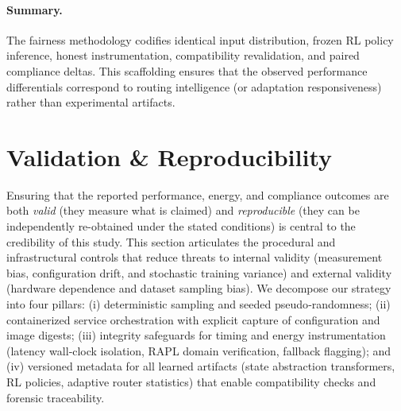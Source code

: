 \paragraph{Summary.}
The fairness methodology codifies identical input distribution, frozen RL policy inference, honest instrumentation, compatibility revalidation, and paired compliance deltas. This scaffolding ensures that the observed performance differentials correspond to routing intelligence (or adaptation responsiveness) rather than experimental artifacts.
 
\section{Validation \& Reproducibility}\label{s:validation-reproducibility}
Ensuring that the reported performance, energy, and compliance outcomes are both \emph{valid} (they measure what is claimed) and \emph{reproducible} (they can be independently re-obtained under the stated conditions) is central to the credibility of this study. This section articulates the procedural and infrastructural controls that reduce threats to internal validity (measurement bias, configuration drift, and stochastic training variance) and external validity (hardware dependence and dataset sampling bias). We decompose our strategy into four pillars: (i) deterministic sampling and seeded pseudo‑randomness; (ii) containerized service orchestration with explicit capture of configuration and image digests; (iii) integrity safeguards for timing and energy instrumentation (latency wall‑clock isolation, RAPL domain verification, fallback flagging); and (iv) versioned metadata for all learned artifacts (state abstraction transformers, RL policies, adaptive router statistics) that enable compatibility checks and forensic traceability.

